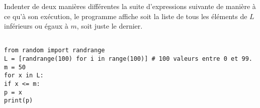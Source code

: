 \exer{}
\setcounter{numques}{0}

Indenter de deux manières différentes la suite d'expressions suivante de manière à ce qu'à son exécution, le programme affiche soit la liste de tous les éléments de $L$ inférieurs ou égaux à $m$, soit juste le dernier.
\begin{lstlisting}

from random import randrange
L = [randrange(100) for i in range(100)] # 100 valeurs entre 0 et 99.
m = 50
for x in L:
if x <= m:
p = x
print(p)
\end{lstlisting}

